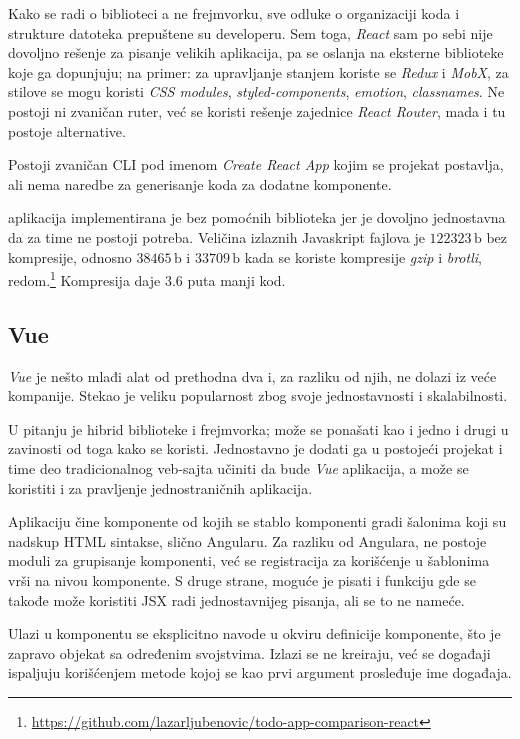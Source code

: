Kako se radi o biblioteci a ne frejmvorku, sve odluke o organizaciji koda i strukture datoteka prepuštene su developeru.
Sem toga, \textsl{React} sam po sebi nije dovoljno rešenje za pisanje velikih aplikacija, pa se oslanja na eksterne biblioteke koje ga dopunjuju; na primer: za upravljanje stanjem koriste se \textsl{Redux} i \textsl{MobX}, za stilove se mogu koristi \textsl{CSS modules}, \textsl{styled-components}, \textsl{emotion}, \textsl{classnames}.
Ne postoji ni zvaničan ruter, već se koristi rešenje zajednice \textsl{React Router}, mada i tu postoje alternative.

Postoji zvaničan CLI pod imenom \textsl{Create React App} kojim se projekat postavlja, ali nema naredbe za generisanje koda za dodatne komponente.

 aplikacija implementirana je bez pomoćnih biblioteka jer je dovoljno jednostavna da za time ne postoji potreba.
Veličina izlaznih Javaskript fajlova je $122323\,\mathrm{b}$ bez kompresije, odnosno $38465\,\mathrm{b}$ i $33709\,\mathrm{b}$ kada se koriste kompresije \textsl{gzip} i \textsl{brotli}, redom.\footnote{\url{https://github.com/lazarljubenovic/todo-app-comparison-react}} Kompresija daje $3.6$ puta manji kod.

\subsection{Vue}

\textsl{Vue} je nešto mlađi alat od prethodna dva i, za razliku od njih, ne dolazi iz veće kompanije.
Stekao je veliku popularnost zbog svoje jednostavnosti i skalabilnosti.

U pitanju je hibrid biblioteke i frejmvorka; može se ponašati kao i jedno i drugi u zavinosti od toga kako se koristi.
Jednostavno je dodati ga u postojeći projekat i time deo tradicionalnog veb-sajta učiniti da bude \textsl{Vue} aplikacija, a može se koristiti i za pravljenje jednostraničnih aplikacija.

Aplikaciju čine komponente od kojih se stablo komponenti gradi šalonima koji su nadskup HTML sintakse, slično Angularu.
Za razliku od Angulara, ne postoje moduli za grupisanje komponenti, već se registracija za korišćenje u šablonima vrši na nivou komponente.
S druge strane, moguće je pisati i  funkciju gde se takođe može koristiti JSX radi jednostavnijeg pisanja, ali se to ne nameće.

Ulazi u komponentu se eksplicitno navode u okviru definicije komponente, što je zapravo objekat sa određenim svojstvima.
Izlazi se ne kreiraju, već se događaji ispaljuju korišćenjem metode  kojoj se kao prvi argument prosleđuje ime događaja.

